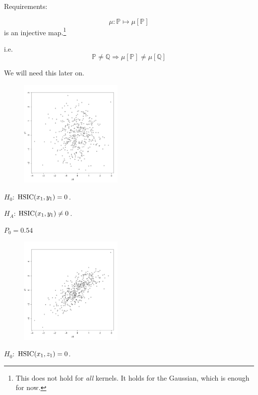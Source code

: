 \clearpage
Requirements:

	\begin{equation*}
		\mu: \mathbb{P} \mapsto \mu[\mathbb{P}]
	\end{equation*}
	is an injective map.\footnote{
		This does not hold for \emph{all} kernels.
		It holds for the Gaussian, which is enough for now.
	}
	
	i.e.
	\begin{equation*}
		\mathbb{P}\ne\mathbb{Q} \Rightarrow \mu[\mathbb{P}] \ne \mu[\mathbb{Q}]
	\end{equation*}
	
	We will need this later on.
	
\clearpage
\begin{figure}
  \begin{center}
    \includegraphics[width=5cm]{x1_vs_y1.pdf}
  \end{center}
\end{figure}
$H_0$: $\operatorname*{HSIC}(x_1, y_1)=0$.

$H_A$: $\operatorname*{HSIC}(x_1, y_1)\ne0$.

$P_0 = 0.54$

\clearpage
\begin{figure}
  \begin{center}
    \includegraphics[width=5cm]{x1_vs_z1.pdf}
  \end{center}
\end{figure}
$H_0$: $\operatorname*{HSIC}(x_1, z_1)=0$.

